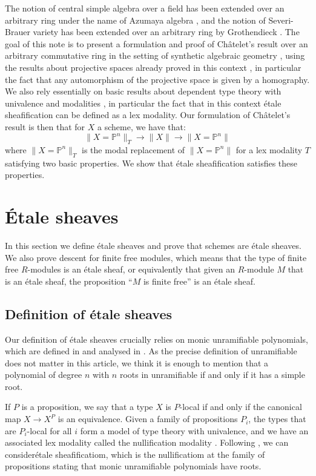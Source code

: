\documentclass[10pt,a4paper]{article}
\theoremstyle{definition}
\newcommand{\propTrunc}[1]{\lVert #1 \rVert}
\newcommand{\bP}{\mathbb{P}}
\begin{document}
The notion of central simple algebra over a field has been extended over an arbitrary ring under the name of Azumaya algebra \cite{azumaya51}, and the notion of Severi-Brauer variety has been extended over an arbitrary ring by Grothendieck \cite{grothendieck68}.
The goal of this note is to present a formulation and proof of Ch\^atelet's result over an arbitrary commutative ring
in the setting of synthetic algebraic geometry \cite{draft}, using the results about projective
spaces already proved in this context \cite{sag-projective}, in particular the fact that any automorphism of the projective space is given by a homography. We also rely essentially on basic results about dependent type theory with univalence \cite{hott}
and modalities \cite{modalities}, in particular the fact that in this context \'etale sheafification can be defined
as a lex modality. Our formulation of Ch\^atelet's result is then that for $X$ a scheme, we have that:
\[\propTrunc{X=\bP^n}_{T} \to \propTrunc{X} \to \propTrunc{X=\bP^n}\]
where $\propTrunc{X=\bP^n}_{T}$ is the modal replacement of $\propTrunc{X=\bP^n}$ for a lex modality $T$ satisfying two basic properties. We show that \'etale sheafification satisfies these properties.



\section{\'Etale sheaves}
\label{etale-sheaves}

In this section we define étale sheaves and prove that schemes are étale sheaves. We also prove descent for finite free modules, which means that the type of finite free $R$-modules is an étale sheaf, or equivalently that given an $R$-module $M$ that is an étale sheaf, the proposition ``$M$ is finite free'' is an étale sheaf.


\subsection{Definition of étale sheaves}

Our definition of étale sheaves crucially relies on monic unramifiable polynomials, which are defined in \cite{wraith79} and analysed in \cite{coqazumaya}. As the precise definition of unramifiable does not matter in this article, we think it is enough to mention that a polynomial of degree $n$ with $n$ roots in unramifiable if and only if it has a simple root.

If $P$ is a proposition, we say that a type $X$ is $P$-local if and only if the canonical map $X\rightarrow X^P$ is an equivalence.
Given a family of propositions $P_i$, the types that are $P_i$-local for all $i$ form a model of type theory with univalence,
and we have an associated lex modality called the nullification modality \cite{modalities,Quirin16}.
Following \cite{wraith79}, we can consider\'etale sheafificatiom, which is the nullificatiom at the family of propositions stating that monic unramifiable polynomials have roots.
\end{document}
